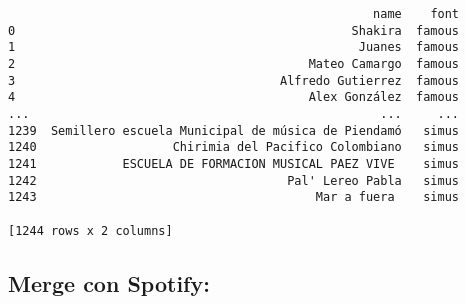 \documentclass[11pt]{article}
\begin{document}
\begin{verbatim}
                                                   name    font
0                                               Shakira  famous
1                                                Juanes  famous
2                                         Mateo Camargo  famous
3                                     Alfredo Gutierrez  famous
4                                         Alex González  famous
...                                                 ...     ...
1239  Semillero escuela Municipal de música de Piendamó   simus
1240                   Chirimia del Pacifico Colombiano   simus
1241            ESCUELA DE FORMACION MUSICAL PAEZ VIVE    simus
1242                                   Pal' Lereo Pabla   simus
1243                                       Mar a fuera    simus

[1244 rows x 2 columns]
\end{verbatim}

\subsection{Merge con Spotify:}
\label{sec:org9023061}
\end{document}
